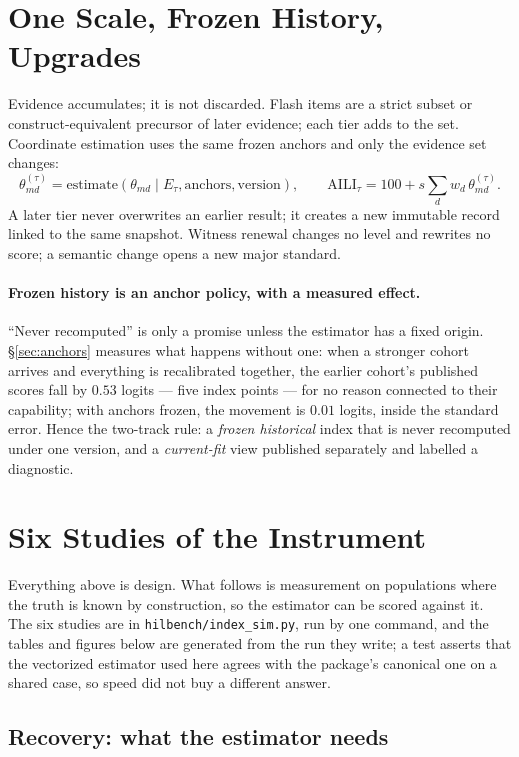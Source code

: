 \section{One Scale, Frozen History, Upgrades}\label{sec:history}

Evidence accumulates; it is not discarded. Flash items are a strict subset or construct-equivalent precursor of later evidence; each tier adds to the set. Coordinate estimation uses the same frozen anchors and only the evidence set changes:
\[
\theta^{(\tau)}_{md} = \text{estimate}(\theta_{md} \mid E_\tau, \text{anchors}, \text{version}), \qquad
\mathrm{AILI}_\tau = 100 + s \sum_d w_d\,\theta^{(\tau)}_{md}.
\]
A later tier never overwrites an earlier result; it creates a new immutable record linked to the same snapshot. Witness renewal changes no level and rewrites no score; a semantic change opens a new major standard.

\paragraph{Frozen history is an anchor policy, with a measured effect.} ``Never recomputed'' is only a promise unless the estimator has a fixed origin. \S\ref{sec:anchors} measures what happens without one: when a stronger cohort arrives and everything is recalibrated together, the earlier cohort's published scores fall by $0.53$ logits --- five index points --- for no reason connected to their capability; with anchors frozen, the movement is $0.01$ logits, inside the standard error. Hence the two-track rule: a \emph{frozen historical} index that is never recomputed under one version, and a \emph{current-fit} view published separately and labelled a diagnostic.

\section{Six Studies of the Instrument}\label{sec:studies}

Everything above is design. What follows is measurement on populations where the truth is known by construction, so the estimator can be scored against it. The six studies are in \texttt{hilbench/index\_sim.py}, run by one command, and the tables and figures below are generated from the run they write; a test asserts that the vectorized estimator used here agrees with the package's canonical one on a shared case, so speed did not buy a different answer.

\subsection{Recovery: what the estimator needs}\label{sec:recovery}

